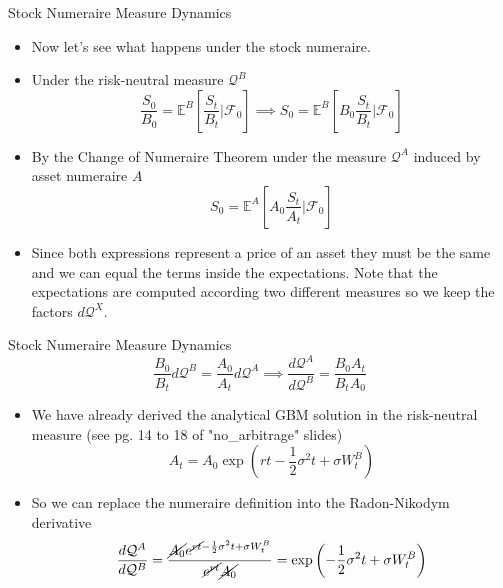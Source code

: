 \documentclass{beamer}
\begin{document}
\begin{frame}{Stock Numeraire Measure Dynamics}
  \begin{itemize}
  \item<1-> Now let's see what happens under the stock numeraire.
  \item<2-> Under the risk-neutral measure $\mathcal{Q}^B$
    \begin{equation*}
      \frac{S_0}{B_0} = \mathbb{E}^B\left[\frac{S_t}{B_t}\bigg|\mathcal{F}_0\right] \implies
      S_0 = \mathbb{E}^B\left[B_0\frac{S_t}{B_t}\bigg|\mathcal{F}_0\right]
    \end{equation*}
  \item<3-> By the Change of Numeraire Theorem under the measure $\mathcal{Q}^A$ induced by asset numeraire $A$
    \begin{equation*}
      S_0 = \mathbb{E}^A\left[A_0\frac{S_t}{A_t}\bigg|\mathcal{F}_0\right]
    \end{equation*}
  \item<4-> Since both expressions represent a price of an asset they must be the same and we can equal the terms inside the expectations. Note that the expectations are computed according two different measures so we keep the factors $d\mathcal{Q}^X$. 
  \end{itemize}
\end{frame}

\begin{frame}{Stock Numeraire Measure Dynamics}
  \begin{equation*}
    \frac{B_0}{B_t}d\mathcal{Q}^B = \frac{A_0}{A_t}d\mathcal{Q}^A\implies \frac{d\mathcal{Q}^A}{d\mathcal{Q}^B}=\frac{B_0A_t}{B_tA_0}
  \end{equation*}
  \begin{itemize}
  \item<2-> We have already derived the analytical GBM solution in the risk-neutral measure (see pg. 14 to 18 of "no\_arbitrage" slides)
    \begin{equation*} 
      A_t = A_0 \exp\left(rt-\frac{1}{2}\sigma^2 t + \sigma W^B_t\right)
    \end{equation*}
    \item<3-> So we can replace the numeraire definition into the Radon-Nikodym derivative
    \begin{equation*}
      \frac{d\mathcal{Q}^A}{d\mathcal{Q}^B}=\frac{\cancel{A_0}e^{\cancel{rt}-\frac{1}{2}\sigma^2 t + \sigma W^B_t}}{\cancel{e^{rt}}\cancel{A_0}}=\exp\left(-\frac{1}{2}\sigma^2 t + \sigma W^B_t\right)
    \end{equation*}
  \end{itemize}
\end{frame}
\end{document}
